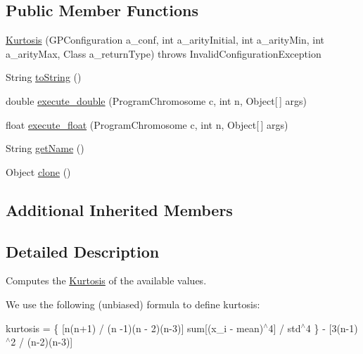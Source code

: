 \subsection*{Public Member Functions}
\begin{DoxyCompactItemize}
\item 
\hyperlink{classorg_1_1jgap_1_1gp_1_1function_1_1statistics_1_1_kurtosis_aa432ba32baa81e774f00d06f8bb03f6a}{Kurtosis} (G\-P\-Configuration a\-\_\-conf, int a\-\_\-arity\-Initial, int a\-\_\-arity\-Min, int a\-\_\-arity\-Max, Class a\-\_\-return\-Type)  throws Invalid\-Configuration\-Exception 
\item 
String \hyperlink{classorg_1_1jgap_1_1gp_1_1function_1_1statistics_1_1_kurtosis_a809015eb2a9e8c95576b2d05d7ed6877}{to\-String} ()
\item 
double \hyperlink{classorg_1_1jgap_1_1gp_1_1function_1_1statistics_1_1_kurtosis_a7f00f264a5fb74bf8cf217f75d5369b4}{execute\-\_\-double} (Program\-Chromosome c, int n, Object\mbox{[}$\,$\mbox{]} args)
\item 
float \hyperlink{classorg_1_1jgap_1_1gp_1_1function_1_1statistics_1_1_kurtosis_a99ae9528f7a72b5d1b5be7bb489732cf}{execute\-\_\-float} (Program\-Chromosome c, int n, Object\mbox{[}$\,$\mbox{]} args)
\item 
String \hyperlink{classorg_1_1jgap_1_1gp_1_1function_1_1statistics_1_1_kurtosis_ae8aba2c2028efa682fcb26bfe9bf9400}{get\-Name} ()
\item 
Object \hyperlink{classorg_1_1jgap_1_1gp_1_1function_1_1statistics_1_1_kurtosis_a503c11ab7a2df00841fef6de32155bfc}{clone} ()
\end{DoxyCompactItemize}
\subsection*{Additional Inherited Members}


\subsection{Detailed Description}
Computes the \hyperlink{classorg_1_1jgap_1_1gp_1_1function_1_1statistics_1_1_kurtosis}{Kurtosis} of the available values. 

We use the following (unbiased) formula to define kurtosis\-:

kurtosis = \{ \mbox{[}n(n+1) / (n -\/1)(n -\/ 2)(n-\/3)\mbox{]} sum\mbox{[}(x\-\_\-i -\/ mean)$^\wedge$4\mbox{]} / std$^\wedge$4 \} -\/ \mbox{[}3(n-\/1)$^\wedge$2 / (n-\/2)(n-\/3)\mbox{]} 

